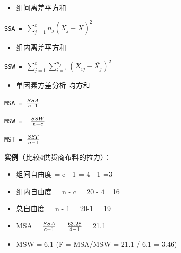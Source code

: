 \begin{itemize}
\tightlist
\item
  组间离差平方和\\
\end{itemize}

\texttt{SSA~=~}\(\sum_{j=1}^c n_j(\overline{X_j} - \overline{\overline{X}})^2\)

\begin{description}
\item[]
\end{description}

\begin{itemize}
\tightlist
\item
  组内离差平方和\\
\end{itemize}

\texttt{SSW~=~}\(\sum_{j=1}^c \sum_{i=1}^{n_j} (X_{ij} - \overline{X_j})^2\)

\begin{description}
\item[]
\end{description}

\begin{itemize}
\tightlist
\item
  单因素方差分析 均方和
\end{itemize}

\texttt{MSA~=~}\({SSA \over c -1}\)

\texttt{MSW~=~~}\({SSW \over n -c}\)

\texttt{MST~=~}\({SST \over n -1}\)

\textbf{实例}（比较4供货商布料的拉力）：

\begin{itemize}
\tightlist
\item
  组间自由度 = c - 1 = 4 - 1 =3
\item
  组内自由度 = n - c = 20 - 4 =16
\item
  总自由度 = n - 1 = 20-1 = 19
\item
  MSA = \({SSA \over c-1}\) = \({63.28 \over 4-1}\) = 21.1
\item
  MSW = 6.1 (F = MSA/MSW = 21.1 / 6.1 = 3.46)
\end{itemize}

